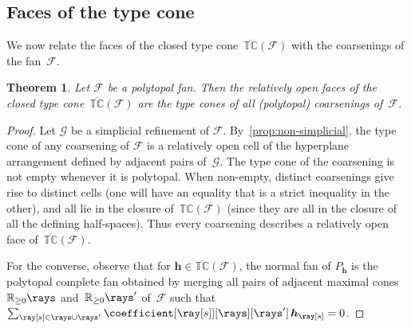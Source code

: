 \documentclass{amsart}
\newtheorem{theorem}{Theorem}[section]
\theoremstyle{definition}
\newcommand{\R}{\mathbb{R}} %
\renewcommand{\c}[1]{{\mathcal{#1}}} %
\renewcommand{\b}[1]{{\boldsymbol{#1}}} %
\newcommand{\Fan}{\mathcal{F}} %
\newcommand{\typeCone}{\mathbb{TC}} %
\newcommand{\ctypeCone}{\overline{\mathbb{TC}}} %
\begin{document}

\subsection{Faces of the type cone}
\label{subsec:facesTypeCone}

We now relate the faces of the closed type cone~$\ctypeCone(\Fan)$ with the coarsenings of the fan~$\Fan$.

\begin{theorem}
Let $\Fan$ be a polytopal fan. Then the relatively open faces of the closed type cone~$\ctypeCone(\Fan)$ are the type cones of all (polytopal) coarsenings of~$\Fan$. 
\end{theorem}

\begin{proof}
Let $\c{G}$ be a simplicial refinement of $\Fan$. By~\cref{prop:non-simplicial}, the type cone of any coarsening of $\Fan$ is a relatively open cell of the hyperplane arrangement defined by adjacent pairs of~$\c{G}$. The type cone of the coarsening is not empty whenever it is polytopal. When non-empty, distinct coarsenings give rise to distinct cells (one will have an equality that is a strict inequality in the other), and all lie in the closure of~$\typeCone(\Fan)$ (since they are all in the closure of all the defining half-spaces).
Thus every coarsening describes a relatively open face of~$\ctypeCone(\Fan)$.
 
For the converse, observe that for $\b{h}\in\ctypeCone(\Fan)$, the normal fan of $P_{\b{h}}$ is the polytopal complete fan obtained by merging all pairs of adjacent maximal cones~$\R_{\ge0}\rays$ and~$\R_{\ge0}\rays'$ of~$\Fan$ such that $\sum_{\ray[s] \in \rays \cup \rays'} \coefficient[{\ray[s]}][\rays][\rays'] \, \b{h}_{\ray[s]} = 0$.
\end{proof}
\end{document}
